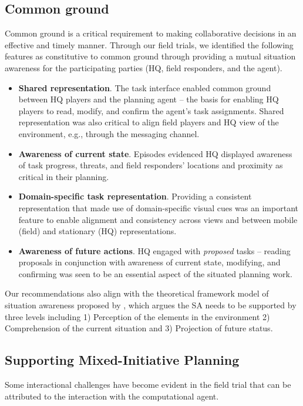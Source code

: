 \subsection{Common ground}
Common ground is a critical requirement to making collaborative decisions in an effective and timely manner. Through our field trials, we identified the following features as constitutive to common ground through providing a mutual situation awareness for the participating parties (HQ, field responders, and the agent).
\begin{itemize}
\item \textbf{Shared representation}. The task interface enabled common ground between HQ players and the planning agent -- the basis for enabling HQ players to read, modify, and confirm the agent's task assignments. Shared representation was also critical to align field players and HQ view of the environment, e.g., through the messaging channel.  
\item \textbf{Awareness of current state}. Episodes evidenced HQ displayed awareness of task progress, threats, and field responders' locations and proximity as critical in their planning.  
\item \textbf{Domain-specific task representation}. Providing a consistent representation that made use of domain-specific visual cues was an important feature to enable alignment and consistency across views and between mobile (field) and stationary (HQ) representations. 
\item \textbf{Awareness of future actions}. HQ engaged with \textit{proposed} tasks -- reading proposals in conjunction with awareness of current state, modifying, and confirming was seen to be an essential aspect of the situated planning work. 
\end{itemize}

Our recommendations also align with the theoretical framework model of situation awareness proposed by \cite{Endsley2001}, which argues the SA needs to be supported by three levels including 1) Perception of the elements in the environment 2) Comprehension of the current situation and 3) Projection of future status.\\ 

\subsection{Supporting Mixed-Initiative Planning} 
Some interactional challenges have become evident in the field trial that can be attributed to the interaction with the computational agent. \\

